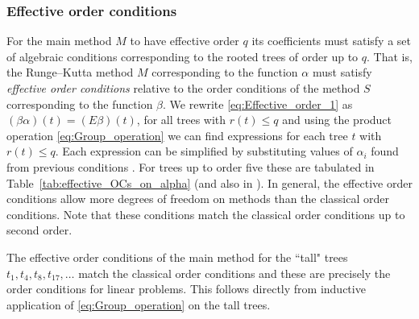 \subsubsection{Effective order conditions}\label{sec:effOrderCond}
For the main method $M$ to have effective order $q$ its coefficients must satisfy a set of algebraic conditions corresponding to the rooted trees of order up to $q$.
That is, the Runge--Kutta method $M$ corresponding to the function $\alpha$ must satisfy
\emph{effective order conditions} relative to the order conditions of the
method $S$ corresponding to the function $\beta$.
We rewrite \eqref{eq:Effective_order_1} as
$(\beta\alpha)(t) = (E\beta)(t)$, for all trees with $r(t) \leq q$ 
and using the product operation \eqref{eq:Group_operation} we can find 
expressions for each tree $t$ with $r(t) \leq q$.
Each expression can be simplified by substituting values of $\alpha_i$ found 
from previous conditions \cite{Butcher2008_book}.
For trees up to order five these are tabulated in Table~\ref{tab:effective_OCs_on_alpha} (and also in \cite[Sec~389]{Butcher2008_book}).
In general, the effective order conditions allow more degrees of
freedom on methods than the classical order conditions.
Note that these conditions match the classical order conditions up to
second order.
\begin{remark}\label{rem:talltrees}
	The effective order conditions of the main method for the ``tall" trees 
	$t_1, t_4, t_8, t_{17}, \dots$ match the classical order conditions
	and these are precisely the order conditions for linear problems.
	This follows directly from inductive application of \eqref{eq:Group_operation}
	on the tall trees.
\end{remark}

